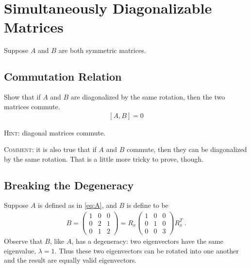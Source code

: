 \documentclass[12pt]{article}
\numberwithin{equation}{section}    %
\begin{document}
\section{Simultaneously Diagonalizable Matrices}

Suppose $A$ and $B$ are both symmetric matrices. 

\subsection{Commutation Relation}

Show that if $A$ and $B$ are diagonalized by the same rotation, then the two matrices commute.
\begin{align}
	\left[A,B\right] = 0
\end{align}

\textsc{Hint:} diagonal matrices commute.

\textsc{Comment:} it is also true that if $A$ and $B$ commute, then they can be diagonalized by the same rotation. That is a little more tricky to prove, though.


\subsection{Breaking the Degeneracy}

Suppose $A$ is defined as in \eqref{eq:A}, and $B$ is define to be
\begin{align}
	B = %
	\begin{pmatrix}
		1 & 0 & 0\\
		0 & 2 & 1\\
		0 & 1 & 2
	\end{pmatrix}
	= 
	R_x 
	\begin{pmatrix}
		1 & 0 & 0 \\
		0 & 1 & 0 \\
		0 & 0 & 3
	\end{pmatrix}
	R_x^T \ .
	\label{eq:B}
\end{align}
%
Observe that $B$, like $A$, has a degeneracy: two eigenvectors have the same eigenvalue, $\lambda=1$. Thus these two eigenvectors can be rotated into one another and the result are equally valid eigenvectors.
\end{document}
